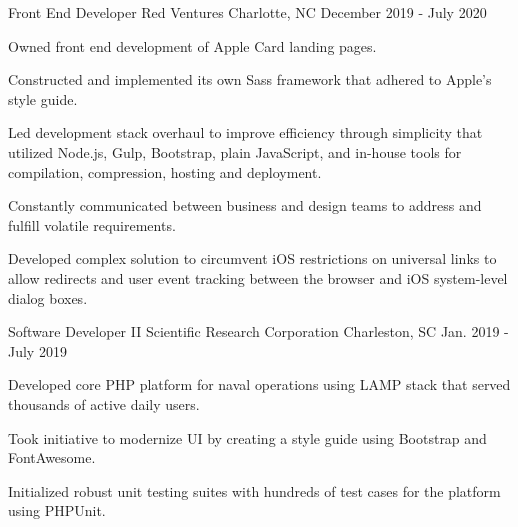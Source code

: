 \begin{cventries}

  \cventry
    {Front End Developer} %
    {Red Ventures} %
    {Charlotte, NC} %
    {December 2019 - July 2020} %
    {
      \begin{cvitems} %
        \item {Owned front end development of Apple Card landing pages.}
        \item {Constructed and implemented its own Sass framework that adhered to Apple's style guide.}
        \item {Led development stack overhaul to improve efficiency through simplicity that utilized Node.js, Gulp, Bootstrap, plain JavaScript, and in-house tools for compilation, compression, hosting and deployment.}
        \item {Constantly communicated between business and design teams to address and fulfill volatile requirements.}
        \item {Developed complex solution to circumvent iOS restrictions on universal links to allow redirects and user event tracking between the browser and iOS system-level dialog boxes.}
      \end{cvitems}
    }

  \cventry
    {Software Developer II} %
    {Scientific Research Corporation} %
    {Charleston, SC} %
    {Jan. 2019 - July 2019} %
    {
      \begin{cvitems} %
        \item {Developed core PHP platform for naval operations using LAMP stack that served thousands of active daily users.}
        \item {Took initiative to modernize UI by creating a style guide using Bootstrap and FontAwesome.}
        \item {Initialized robust unit testing suites with hundreds of test cases for the platform using PHPUnit.}
      \end{cvitems}
    }


\end{cventries}
